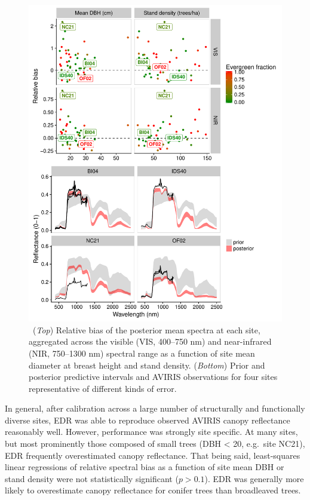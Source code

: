 \begin{figure}
  \centering
  \includegraphics[width=\textwidth]{4_edr/figures/spec_validation.pdf}
  \caption{\
    (\textit{Top}) Relative bias of the posterior mean spectra at each site, aggregated across the visible (VIS, 400--750 nm) and near-infrared (NIR, 750--1300 nm) spectral range
    as a function of site mean diameter at breast height and stand density.
    (\textit{Bottom}) Prior and posterior predictive intervals and AVIRIS observations for four sites representative of different kinds of error.
  }\label{fig:bias}
\end{figure}

In general, after calibration across a large number of structurally and functionally diverse sites, EDR was able to reproduce observed AVIRIS canopy reflectance reasonably well.
However, performance was strongly site specific.
At many sites, but most prominently those composed of small trees (DBH < 20, e.g.\ site NC21), EDR frequently overestimated canopy reflectance.
That being said, least-squares linear regressions of relative spectral bias as a function of site mean DBH or stand density were not statistically significant ($p > 0.1$).
EDR was generally more likely to overestimate canopy reflectance for conifer trees than broadleaved trees.

